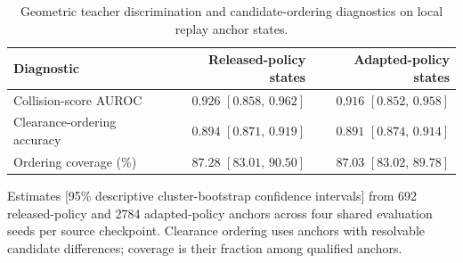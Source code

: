 \begin{table}[!htbp]
 \caption{Geometric teacher discrimination and candidate-ordering diagnostics on local replay anchor states.}
 \label{tab:teacher}
 \centering
 \tablebodyfont
 \renewcommand{\arraystretch}{1.16}
 \setlength{\tabcolsep}{5pt}
\begin{tabular*}{\textwidth}{@{\extracolsep{\fill}}lrr@{}}
\toprule
Diagnostic & Released-policy states & Adapted-policy states \\
\midrule
Collision-score AUROC & $0.926$ $[0.858,\,0.962]$ & $0.916$ $[0.852,\,0.958]$ \\
Clearance-ordering accuracy & $0.894$ $[0.871,\,0.919]$ & $0.891$ $[0.874,\,0.914]$ \\
\addlinespace[3pt]
Ordering coverage (\%) & $87.28$ $[83.01,\,90.50]$ & $87.03$ $[83.02,\,89.78]$ \\
\bottomrule
\end{tabular*}
 \par\vspace{3pt}\noindent
 \parbox{\textwidth}{\tablenotefont Estimates [95\% descriptive cluster-bootstrap confidence intervals] from 692 released-policy and 2784 adapted-policy anchors across four shared evaluation seeds per source checkpoint. Clearance ordering uses anchors with resolvable candidate differences; coverage is their fraction among qualified anchors.}
\end{table}
